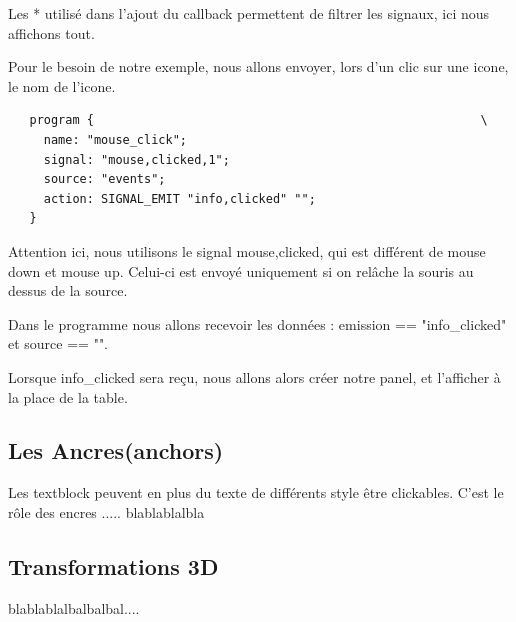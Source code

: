 \documentclass[a4paper]{efr}
\begin{document}
Les * utilisé dans l'ajout du callback permettent de filtrer les signaux, ici
nous affichons tout.

Pour le besoin de notre exemple, nous allons envoyer, lors d'un clic sur une
icone, le nom de l'icone.
\begin{lstlisting}
   program {                                                      \
     name: "mouse_click";
     signal: "mouse,clicked,1";
     source: "events";
     action: SIGNAL_EMIT "info,clicked" "";
   }
\end{lstlisting}

Attention ici, nous utilisons le signal mouse,clicked, qui est différent de
mouse down et mouse up. Celui-ci est envoyé uniquement si on relâche la souris
au dessus de la source.

Dans le programme nous allons recevoir les données : emission == "info\_clicked"
et source == "".

Lorsque info\_clicked sera reçu, nous allons alors créer notre panel, et
l'afficher à la place de la table.

\subsection{Les Ancres(anchors)}

Les textblock peuvent en plus du texte de différents style être clickables.
C'est le rôle des encres ..... blablablalbla

\subsection{Transformations 3D}

blablablalbalbalbal....
\end{document}
